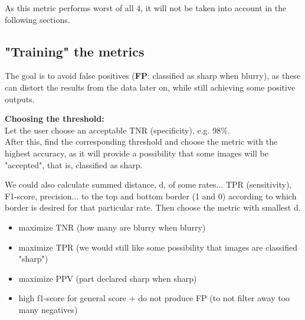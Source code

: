 As this metric performs worst of all 4, it will not be taken into account in the following sections.



\subsection{"Training" the metrics}
The goal is to avoid false positives (\textbf{FP}: classified as sharp when blurry), as these can distort the results from the data later on, while still achieving some positive outputs.

\textbf{Choosing the threshold:}\\
Let the user choose an acceptable TNR (specificity), e.g. 98\%.\\
After this, find the corresponding threshold and choose the metric with the highest accuracy, as it will provide a possibility that some images will be "accepted", that is, classified as sharp. 

We could also calculate summed distance, d, of some rates... TPR (sensitivity), F1-score, precision...  to the top and bottom border (1 and 0) according to which border is desired for that particular rate. Then choose the metric with smallest d.


\begin{itemize}
    \item maximize TNR (how many are blurry when blurry)
    \item maximize TPR (we would still like some possibility that images are classified "sharp")
    \item maximize PPV (part declared sharp when sharp)
    \item high f1-score for general score + do not produce FP (to not filter away too many negatives)
\end{itemize}


